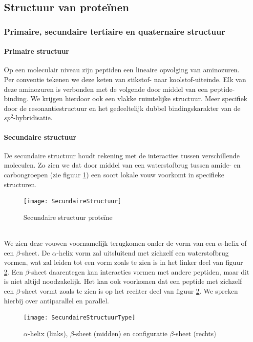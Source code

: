 \documentclass[a4paper,kul]{kulakarticle} %
\begin{document}
\subsection{Structuur van proteïnen}
\subsubsection{Primaire, secundaire tertiaire en quaternaire structuur}
\paragraph{Primaire structuur}
Op een moleculair niveau zijn peptiden een lineaire opvolging van aminozuren. Per conventie tekenen we deze keten van stikstof- naar koolstof-uiteinde. Elk van deze aminozuren is verbonden met de volgende door middel van een peptide-binding. We krijgen hierdoor ook een vlakke ruimtelijke structuur. Meer specifiek door de resonantiestructuur en het gedeeltelijk dubbel bindingskarakter van de $sp^2$-hybridisatie. 
\paragraph{Secundaire structuur}
De secundaire structuur houdt rekening met de interacties tussen verschillende moleculen. Zo zien we dat door middel van een waterstofbrug tussen amide- en carbongroepen (zie figuur \ref{fig:secundairestructuur}) een soort lokale vouw voorkomt in specifieke structuren. 
\begin{figure}[h]
	\centering
	\texttt{[image: SecundaireStructuur]}
	\caption[Secundaire structuur proteïne]{Secundaire structuur proteïne}
	\label{fig:secundairestructuur}
\end{figure}\\
We zien deze vouwen voornamelijk terugkomen onder de vorm van een $\alpha$-helix of een $\beta$-sheet. De $\alpha$-helix vorm zal uitsluitend met zichzelf een waterstofbrug vormen, wat zal leiden tot een vorm zoals te zien is in het linker deel van figuur \ref{fig:secundairestructuurtype}. Een $\beta$-sheet daarentegen kan interacties vormen met andere peptiden, maar dit is niet altijd noodzakelijk. Het kan ook voorkomen dat een peptide met zichzelf een $\beta$-sheet vormt zoals te zien is op het rechter deel van figuur \ref{fig:secundairestructuurtype}. We spreken hierbij over antiparallel en parallel.
\begin{figure}[h]
	\centering
	\texttt{[image: SecundaireStructuurType]}
	\caption[Secundaire structuur type]{$\alpha$-helix (links), $\beta$-sheet (midden) en configuratie $\beta$-sheet (rechts)}
	\label{fig:secundairestructuurtype}
\end{figure}
\newpage
\end{document}
